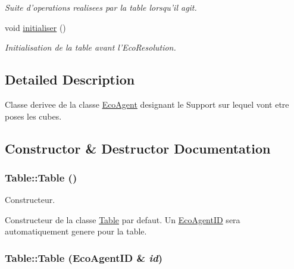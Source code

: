 \begin{CompactItemize}
\begin{CompactList}\small\item\em Suite d'operations realisees par la table lorsqu'il agit. \item\end{CompactList}\item 
\hypertarget{classTable_964952b5f899c8abb64e9622a8457466}{
void \hyperlink{classTable_964952b5f899c8abb64e9622a8457466}{initialiser} ()}
\label{classTable_964952b5f899c8abb64e9622a8457466}

\begin{CompactList}\small\item\em Initialisation de la table avant l'EcoResolution. \item\end{CompactList}\end{CompactItemize}


\subsection{Detailed Description}
Classe derivee de la classe \hyperlink{classEcoAgent}{EcoAgent} designant le Support sur lequel vont etre poses les cubes. 

\subsection{Constructor \& Destructor Documentation}
\hypertarget{classTable_049f2e06391781ae255c6698869c4ad1}{
\subsubsection[{Table}]{\setlength{\rightskip}{0pt plus 5cm}Table::Table ()}}
\label{classTable_049f2e06391781ae255c6698869c4ad1}


Constructeur. 

Constructeur de la classe \hyperlink{classTable}{Table} par defaut. Un \hyperlink{classEcoAgentID}{EcoAgentID} sera automatiquement genere pour la table. \hypertarget{classTable_f82a6d490aa166537ac2e42e83ec8cd3}{
\subsubsection[{Table}]{\setlength{\rightskip}{0pt plus 5cm}Table::Table ({\bf EcoAgentID} \& {\em id})}}
\label{classTable_f82a6d490aa166537ac2e42e83ec8cd3}


